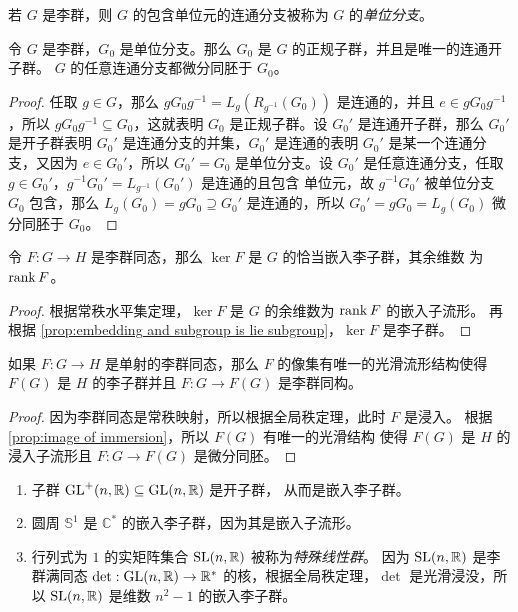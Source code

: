 若 $G$ 是李群，则 $G$ 的包含单位元的连通分支被称为 $G$ 的\emph{单位分支}。

\begin{proposition}
  令 $G$ 是李群，$G_0$ 是单位分支。那么 $G_0$ 是 $G$ 的正规子群，并且是唯一的连通开子群。
  $G$ 的任意连通分支都微分同胚于 $G_0$。
\end{proposition}
\begin{proof}
  任取 $g\in G$，那么 $gG_0g^{-1}=L_g\left(R_{g^{-1}}(G_0)\right)$ 是连通的，并且 $e\in gG_0g^{-1}$，所以
  $gG_0g^{-1}\subseteq G_0$，这就表明 $G_0$ 是正规子群。设 $G_0'$ 是连通开子群，那么 $G_0'$ 是开子群表明
  $G_0'$ 是连通分支的并集，$G_0'$ 是连通的表明 $G_0'$ 是某一个连通分支，又因为 $e\in G_0'$，所以 $G_0'=G_0$
  是单位分支。设 $G_0'$ 是任意连通分支，任取 $g\in G_0'$，$g^{-1}G_0'=L_{g^{-1}}(G_0')$ 是连通的且包含
  单位元，故 $g^{-1}G_0'$ 被单位分支 $G_0$ 包含，那么 $L_{g}(G_0)=gG_0\supseteq G_0'$ 是连通的，所以
  $G_0'=gG_0=L_g(G_0)$ 微分同胚于 $G_0$。
\end{proof}
 
\begin{proposition}
  令 $F:G\to H$ 是李群同态，那么 $\ker F$ 是 $G$ 的恰当嵌入李子群，其余维数
  为 $\operatorname{rank} F$。
\end{proposition}
\begin{proof}
  根据常秩水平集定理，$\ker F$ 是 $G$ 的余维数为 $\operatorname{rank} F$ 的嵌入子流形。
  再根据 \autoref{prop:embedding and subgroup is lie subgroup}，$\ker F$
  是李子群。
\end{proof}

\begin{proposition}\label{prop:image of injective lie group homomorphism}
  如果 $F:G\to H$ 是单射的李群同态，那么 $F$ 的像集有唯一的光滑流形结构使得
  $F(G)$ 是 $H$ 的李子群并且 $F:G\to F(G)$ 是李群同构。
\end{proposition}
\begin{proof}
  因为李群同态是常秩映射，所以根据全局秩定理，此时 $F$ 是浸入。
  根据 \autoref{prop:image of immersion}，所以 $F(G)$ 有唯一的光滑结构
  使得 $F(G)$ 是 $H$ 的浸入子流形且 $F:G\to F(G)$ 是微分同胚。
\end{proof}

\begin{example}[嵌入李子群]
  \mbox{}
  \begin{enumerate}
    \item 子群 $\operatorname{GL}^+(n,\mathbb{R})\subseteq \operatorname{GL}(n,\mathbb{R})$ 是开子群，
    从而是嵌入李子群。
    \item 圆周 $\mathbb{S}^1$ 是 $\mathbb{C}^*$ 的嵌入李子群，因为其是嵌入子流形。
    \item 行列式为 $1$ 的实矩阵集合 $\operatorname{SL}(n,\mathbb{R})$ 被称为\emph{特殊线性群}。
    因为 $\operatorname{SL}(n,\mathbb{R})$ 是李群满同态 $\det:\operatorname{GL}(n,\mathbb{R})\to \mathbb{R}^*$
    的核，根据全局秩定理，$\det$ 是光滑浸没，所以 $\operatorname{SL}(n,\mathbb{R})$ 是维数
    $n^2-1$ 的嵌入李子群。
  \end{enumerate}
\end{example}

